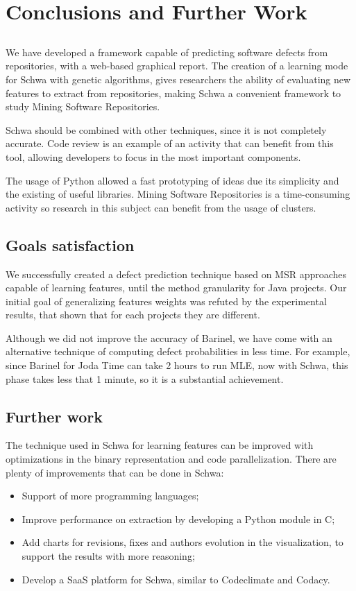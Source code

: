 \chapter{Conclusions and Further Work} \label{chap:concl}

\section*{}
We have developed a framework capable of predicting software defects from
repositories, with a web-based graphical report. The creation of a learning mode
for Schwa with genetic algorithms, gives researchers the ability of evaluating
new features to extract from repositories, making Schwa a convenient framework
to study Mining Software Repositories.

Schwa should be combined with other techniques, since it is not completely
accurate. Code review is an example of an activity that can benefit from this
tool, allowing developers to focus in the most important components.

The usage of Python allowed a fast prototyping of ideas due its simplicity and
the existing of useful libraries. Mining Software Repositories is a
time-consuming activity so research in this subject can benefit from the usage
of clusters.

\section{Goals satisfaction}
We successfully created a defect prediction technique based on MSR approaches
capable of learning features, until the method granularity for Java projects.
Our initial goal of generalizing features weights was refuted by the
experimental results, that shown that for each projects they are different.

Although we did not improve the accuracy of Barinel, we have come with an
alternative technique of computing defect probabilities in less time. For
example, since Barinel for Joda Time can take 2 hours to run MLE, now with
Schwa, this phase takes less that 1 minute, so it is a substantial achievement.

\section{Further work}
The technique used in Schwa for learning features can be improved with
optimizations in the binary representation and code parallelization. There are
plenty of improvements that can be done in Schwa:
\begin{itemize}
\item Support of more programming languages;
\item Improve performance on extraction by developing a Python module in C;
\item Add charts for revisions, fixes and authors evolution in the visualization,
to support the results with more reasoning;
\item Develop a SaaS platform for Schwa, similar to Codeclimate and Codacy.
\end{itemize}


